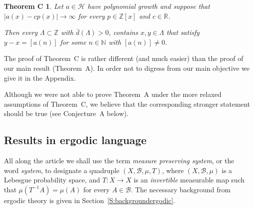\documentclass[11pt]{amsart}
\renewcommand{\H}{\mathcal{H}}
\newcommand{\R}{\mathbb{R}}
\newcommand{\N}{\mathbb{N}}
\newcommand{\Z}{\mathbb{Z}}
\theoremstyle{plain}
\newtheorem*{theoremC}{Theorem C}
\newtheorem*{conjecture}{Conjecture}
\theoremstyle{definition}
\theoremstyle{remark}
\newtheorem*{remark}{Remark}
\begin{document}
\begin{theoremC}\label{T:singlehardy}
  Let $a\in\H$ have polynomial growth and suppose that  $|a(x)-cp(x)|\to \infty $ for every $p\in
  \Z[x]$ and
  $c\in \R$.

  Then  every $\Lambda\subset\mathbb{Z}$ with $\bar{d}(\Lambda)>0$,
  contains  $x,y\in \Lambda$ that satisfy  $y-x=[a(n)]$ for some
  $n\in\N$ with $[a(n)]\neq 0$.
\end{theoremC}
The proof of Theorem~C is rather different (and much easier) than the
proof of our main result (Theorem~A). In order not to digress from our
main objective we give it in the Appendix.

Although we were not able to prove Theorem~A under the more relaxed
assumptions of Theorem~C, we believe that the corresponding stronger
statement should be true (see Conjecture~A below).




\subsection{Results in ergodic language}\label{SS:ergodic}
All along the article we shall use the term {\it measure preserving
  system}, or the word {\it system}, to designate a quadruple
$(X,\mathcal{B},\mu, T)$, where $(X,\mathcal{B},\mu)$ is a Lebesgue
probability space, and $T\colon X\to X$ is an \emph{invertible}
measurable map such that $\mu(T^{-1}A)=\mu(A)$ for every
$A\in\mathcal{B}$. The necessary background from ergodic theory is
given in Section~\ref{S:backgroundergodic}.
\end{document}
